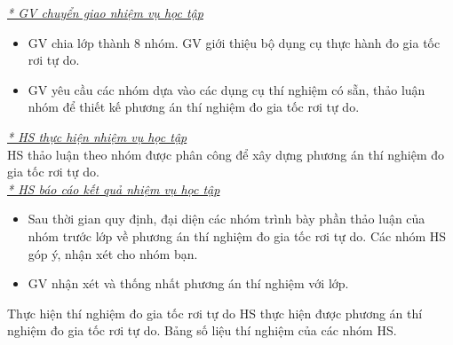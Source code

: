 {\textit{\underline{* GV chuyển giao nhiệm vụ học tập}}
	\begin{itemize}[label=-]
		\item GV chia lớp thành 8 nhóm. GV giới thiệu bộ dụng cụ thực hành đo gia tốc rơi tự do. 
		\item GV yêu cầu các nhóm dựa vào các dụng cụ thí nghiệm có sẵn, thảo luận nhóm để thiết kế phương án thí nghiệm đo gia tốc rơi tự do.
	\end{itemize}
	\textit{\underline{* HS thực hiện nhiệm vụ học tập}}\\
	HS thảo luận theo nhóm được phân công để xây dựng phương án thí nghiệm đo gia tốc rơi tự do.\\
	\textit{\underline{* HS báo cáo kết quả nhiệm vụ học tập}}
	\begin{itemize}[label=-]
		\item Sau thời gian quy định, đại diện các nhóm trình bày phần thảo luận của nhóm trước lớp về phương án thí nghiệm đo gia tốc rơi tự do. Các nhóm HS góp ý, nhận xét cho nhóm bạn.
		\item GV nhận xét và thống nhất phương án thí nghiệm với lớp.
	\end{itemize}
}
\hoatdong
{Thực hiện thí nghiệm đo gia tốc rơi tự do
}
{HS thực hiện được phương án thí nghiệm đo gia tốc rơi tự do.
}
{Bảng số liệu thí nghiệm của các nhóm HS.
}
